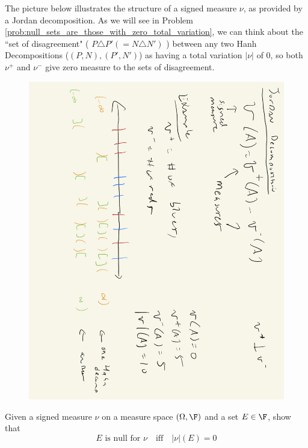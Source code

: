 \documentclass{article} %
\begin{document}
\begin{remark}{}
The picture below illustrates the structure of a signed measure $\nu$, as provided by a Jordan decomposition. As we will see in Problem \ref{prob:null_sets_are_those_with_zero_total_variation}, we can think about the ``set of disagreement" ( $P \triangle P' (= N \triangle N')$ ) between any two Hanh Decompositions ($(P,N), (P',N')$) as having a total variation $|\nu|$ of 0, so both $\nu^+$ and $\nu^-$ give zero measure to the sets of disagreement.
\begin{figure}[H]
\centering 
\includegraphics[width=.6\textwidth, angle=90]{images/hanh_jordan_decomp}
\end{figure}

\end{remark}

\begin{problem}{}
Given a signed measure $\nu$ on a measure space $(\Omega,\F)$ and a set $E \in \F$, show that
\[ \text{$E$ is null for $\nu$}  \quad \text{iff} \quad |\nu|(E) = 0 \]	
\label{prob:null_sets_are_those_with_zero_total_variation}
\end{problem}
\end{document}
